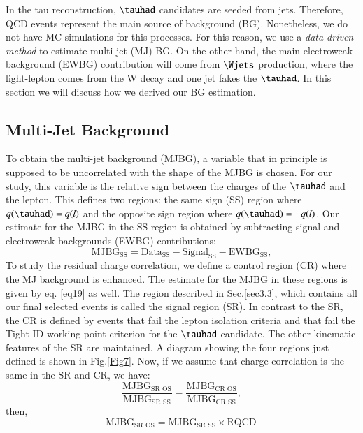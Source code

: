 In the tau reconstruction, $\tauhad$ candidates are seeded from jets. Therefore, QCD events represent the main source of background (BG). Nonetheless, we do not have MC simulations for this processes. For this reason, we use a \textit{data driven method} to estimate multi-jet (MJ) BG. On the other hand, the main electroweak background (EWBG) contribution will come from $\Wjets$ production, where the light-lepton comes from the W decay and one jet fakes the $\tauhad$. In this section we will discuss how we derived our BG estimation.

\subsection{Multi-Jet Background}
To obtain the multi-jet background (MJBG), a variable that in principle is supposed to be uncorrelated with the shape of the MJBG is chosen. For our study, this variable is the relative sign between the charges of the $\tauhad$ and the lepton. This defines two regions: the same sign (SS) region where $q(\tauhad)=q(l)$ and the opposite sign region where $q(\tauhad)=-q(l)$. Our estimate for the MJBG in the SS region is obtained by subtracting signal and electroweak backgrounds (EWBG) contributions:
\begin{equation}
\text{MJBG}_{\text{SS}}=\text{Data}_{\text{SS}}-\text{Signal}_{\text{SS}}-\text{EWBG}_{\text{SS}},
\label{eq19}
\end{equation}
 To study the residual charge correlation, we define a control region (CR) where the MJ background is enhanced. The estimate for the MJBG in these regions is given by eq. \ref{eq19} as well. The region described in Sec.\ref{sec3.3}, which contains all our final selected events is called the signal region (SR). In contrast to the SR, the CR is defined by events that fail the lepton isolation criteria and that fail the Tight-ID working point criterion for the $\tauhad$ candidate. The other kinematic features of the SR are maintained. A diagram showing the four regions just defined is shown in Fig.\ref{Fig7}. Now, if we assume that charge correlation is the same in the SR and CR, we have:
 \begin{equation}
 \frac{\text{MJBG}_{\text{SR OS}}}{\text{MJBG}_{\text{SR SS}}}=\frac{\text{MJBG}_{\text{CR OS}}}{\text{MJBG}_{\text{CR SS}}},
 \end{equation}
then,
 \begin{equation}
\text{MJBG}_{\text{SR OS}}=\text{MJBG}_{\text{SR SS}}\times \text{RQCD}\,
\label{eq36}
\end{equation}
